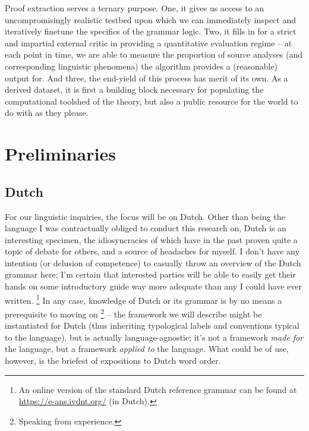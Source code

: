 Proof extraction serves a ternary purpose.
One, it gives us access to an uncompromisingly realistic testbed upon which we can immediately inspect and iteratively finetune the specifics of the grammar logic.
Two, it fills in for a strict and impartial external critic in providing a quantitative evaluation regime -- at each point in time, we are able to measure the proportion of source analyses (and corresponding linguistic phenomena) the algorithm provides a (reasonable) output for.
And three, the end-yield of this process has merit of its own.
As a derived dataset, it is first a building block necessary for populating the computational toolshed of the theory, but also a public resource for the world to do with as they please.

\section{Preliminaries}
\label{section:preliminaries}

\subsection{Dutch}
For our linguistic inquiries, the focus will be on Dutch.
Other than being the language I was contractually obliged to conduct this research on, Dutch is an interesting specimen, the idiosyncracies of which have in the past proven quite a topic of debate for others, and a source of headaches for myself.
I don't have any intention (or delusion of competence) to casually throw an overview of the Dutch grammar here; I'm certain that interested parties will be able to easily get their hands on some introductory guide way more adequate than any I could have ever written.%
	\footnote{An online version of the standard Dutch reference grammar can be found at \url{https://e-ans.ivdnt.org/} (in Dutch).}
In any case, knowledge of Dutch or its grammar is by no means a prerequisite to moving on%
	\footnote{Speaking from experience.} -- the framework we will describe might be instantiated for Dutch (thus inheriting typological labels and conventions typical to the language), but is actually language-agnostic; it's not a framework \textit{made for} the language, but a framework \textit{applied to} the language.	
What could be of use, however, is the briefest of expositions to Dutch word order.

